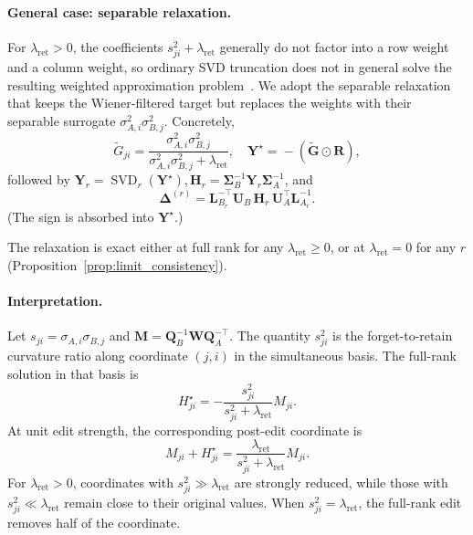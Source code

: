 \documentclass[11pt]{article}
\begin{document}
\paragraph{General case: separable relaxation.}
For $\lambda_{\mathrm{ret}}>0$, the coefficients
$s_{ji}^2+\lambda_{\mathrm{ret}}$ generally do not factor into a row weight and a column weight, so ordinary SVD truncation does not in general solve the resulting weighted approximation problem~\citep{DBLP:conf/icml/SrebroJ03}. We adopt the separable relaxation that keeps the Wiener-filtered target but replaces the weights with their separable surrogate $\sigma_{A,i}^2\sigma_{B,j}^2$. Concretely,
\begin{equation}
    \widetilde{G}_{ji}
    \!=\!
    \frac{\sigma_{A,i}^2\sigma_{B,j}^2}
    {\sigma_{A,i}^2\sigma_{B,j}^2+\lambda_{\mathrm{ret}}},\!
    \quad
    \mathbf{Y}^\star
    \!=\!
    -(\!\widetilde{\mathbf{G}}\!\odot\!\mathbf{R}),
\label{eq:relaxation_target}
\end{equation}
followed by $\mathbf{Y}_r\!=\!\operatorname{SVD}_r(\mathbf{Y}^\star),\mathbf{H}_r\!=\!\mathbf{\Sigma}_B^{-1}\mathbf{Y}_r\mathbf{\Sigma}_A^{-1}$, and
\begin{equation}
    \mathbf{\Delta}^{(r)}
    \!=\!\mathbf{L}_{B_r}^{-\top}\mathbf{U}_B\,\!
    \mathbf{H}_r\,
    \mathbf{U}_A^\top\mathbf{L}_{A_r}^{-1}.
\label{eq:kforge_relaxed_delta}
\end{equation}
(The sign is absorbed into $\mathbf{Y}^\star$.)

The relaxation is exact either at full rank for any $\lambda_{\text{ret}}\ge0$, or at $\lambda_{\text{ret}}=0$ for any $r$ (Proposition~\ref{prop:limit_consistency}).

\paragraph{Interpretation.}
Let $s_{ji}=\sigma_{A,i}\sigma_{B,j}$ and
$\mathbf{M}=\mathbf{Q}_B^{-1}\mathbf{W}\mathbf{Q}_A^{-\top}$.
The quantity $s_{ji}^{2}$ is the forget-to-retain curvature ratio along coordinate $(j,i)$ in the simultaneous basis.
The full-rank solution in that basis is
\begin{equation}
    H_{ji}^{\star}
    =-\frac{s_{ji}^{2}}
    {s_{ji}^{2}+\lambda_{\mathrm{ret}}}M_{ji}.
\end{equation}
At unit edit strength, the corresponding post-edit coordinate is
\begin{equation}
    M_{ji}+H_{ji}^{\star}
    =\frac{\lambda_{\mathrm{ret}}}
    {s_{ji}^{2}+\lambda_{\mathrm{ret}}}M_{ji}.
\end{equation}
For $\lambda_{\mathrm{ret}}>0$, coordinates with $s_{ji}^{2}\gg\lambda_{\mathrm{ret}}$ are strongly reduced, while those with $s_{ji}^{2}\ll\lambda_{\mathrm{ret}}$ remain close to their original values.
When $s_{ji}^{2}=\lambda_{\mathrm{ret}}$, the full-rank edit removes half of the coordinate.
\end{document}
